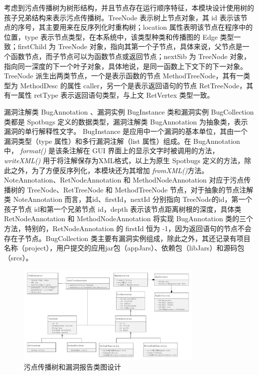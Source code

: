 考虑到污点传播树为树形结构，并且节点存在运行顺序特征，本模块设计使用树的孩子兄弟结构来表示污点传播树。TreeNode 表示树上节点对象，其 id 表示该节点的序号，其主要用来在反序列化时重构树；location 属性表明该节点在程序中的位置，type 表示节点类型，在本系统中，该类型种类和传播图的 Edge 类型一致；firstChild 为 TreeNode 对象，指向其第一个子节点，具体来说，父节点是一个函数节点，而子节点可以为函数节点或返回节点；nextSib 为 TreeNode 对象，指向同一深度的下一个叶子对象，具体地说，是同一函数上下文下的下一对象。TreeNode 派生出两类节点，一个是表示函数的节点 MethodTreeNode，其有一类型为 MethodDesc 的属性 caller，另一个是表示返回语句的节点 RetTreeNode，其有一属性 retType 表示返回语句类型，与上文 RetVertex 类型一致。

漏洞注解类 BugAnnotation 、漏洞实例 BugInstance 类和漏洞实例 BugCollection 类都是 Spotbugs 定义的数据类型，漏洞注解类 BugAnnotation 为抽象类，表示漏洞的单行解释性文字。
BugInstance 是应用中一个漏洞的基本单位，其由一个漏洞类型（type 属性）和多行漏洞注解（list 属性）组成。在 BugAnnotation 中， \textit{format()} 是该条注解在 GUI 界面上的显示文字时被调用的方法，\textit{writeXML()} 用于将注解保存为XML格式，以上为原生 Spotbugs 定义的方法，除此之外，为了方便反序列化，本模块还为其增加 \textit{fromXML()}方法。NoteAnnotation、RetNodeAnnotation 和 MethodNodeAnnotation 对应于污点传播树的 TreeNode、RetTreeNode 和 MethodTreeNode 节点，对于抽象的节点注解类 NoteAnnotation 而言，其id、firstId，nextId 分别指向 TreeNode的id，第一个孩子节点 id和第一个兄弟节点 id，depth 表示该节点距离树根的深度，具体类 RetNodeAnnotation 和 MethodNodeAnnotation 将实现 BugAnnotation 类的三个方法，特别的，RetNodeAnnotation 的 firstId 恒为 -1，因为返回语句的节点不会存在子节点。BugCollection 类主要有漏洞实例组成，除此之外，其还记录有项目名称（project），用户提交的应用jar包（appJars）、依赖包（libJars）和源码包（srcs）。

\begin{figure}[!htb]
	\centering
	\includegraphics[width=0.8\textwidth]{FIGs/chapter3/taintTreeAnnotationClass.pdf}
	\caption{污点传播树和漏洞报告类图设计}\label{taintTreeAnnotationClass}
\end{figure}

